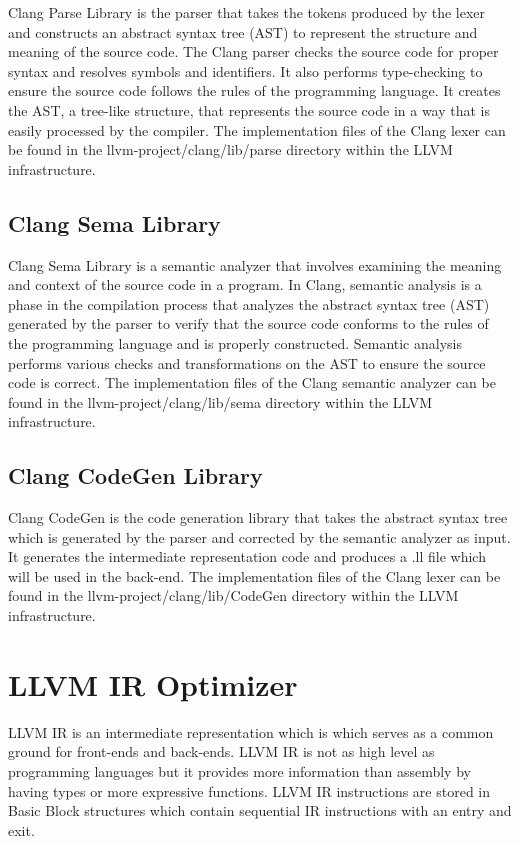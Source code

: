 Clang Parse Library is the parser that takes the tokens produced by the lexer and constructs an abstract syntax tree (AST) to represent the structure and meaning of the source code. The Clang parser checks the source code for proper syntax and resolves symbols and identifiers. It also performs type-checking to ensure the source code follows the rules of the programming language. It creates the AST, a tree-like structure, that represents the source code in a way that is easily processed by the compiler. The implementation files of the Clang lexer can be found in the llvm-project/clang/lib/parse directory within the LLVM infrastructure.

\subsection{Clang Sema Library}

Clang Sema Library is a semantic analyzer that involves examining the meaning and context of the source code in a program. In Clang, semantic analysis is a phase in the compilation process that analyzes the abstract syntax tree (AST) generated by the parser to verify that the source code conforms to the rules of the programming language and is properly constructed. Semantic analysis performs various checks and transformations on the AST to ensure the source code is correct. The implementation files of the Clang semantic analyzer can be found in the llvm-project/clang/lib/sema directory within the LLVM infrastructure.

\subsection{Clang CodeGen Library}

Clang CodeGen is the code generation library that takes the abstract syntax tree which is generated by the parser and corrected by the semantic analyzer as input. It generates the intermediate representation code and produces a .ll file which will be used in the back-end. The implementation files of the Clang lexer can be found in the llvm-project/clang/lib/CodeGen directory within the LLVM infrastructure. 

\section{LLVM IR Optimizer}\label{sec:opt}
LLVM IR is an intermediate representation which is which serves as a common ground for front-ends and back-ends. LLVM IR is not as high level as programming languages but it provides more information than assembly by having types or more expressive functions. LLVM IR instructions are stored in Basic Block structures which contain sequential IR instructions with an entry and exit. 

